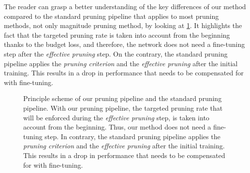 The reader can grasp a better understanding of the key differences of our method
compared to the standard pruning pipeline that applies to most pruning methods,
not only magnitude pruning method, by looking at
\cref{fig:chap1:pruning_pipeline_comparison}. It highlights the fact that the
targeted pruning rate is taken into account from the beginning thanks to the
budget loss, and therefore, the network does not need a fine-tuning step after
the \emph{effective pruning} step. On the contrary, the standard pruning
pipeline applies the \emph{pruning criterion} and the \emph{effective pruning}
after the initial training. This results in a drop in performance that needs to
be compensated for with fine-tuning. \\

\begin{figure}
  \centering
    \caption{ Principle scheme of our pruning pipeline and the standard pruning
    pipeline. With our pruning pipeline, the targeted pruning rate that will be
    enforced during the \emph{effective pruning} step, is taken into account
    from the beginning. Thus, our method does not need a fine-tuning step. In
    contrary, the standard pruning pipeline applies the \emph{pruning criterion}
    and the \emph{effective pruning} after the initial training. This results in
    a drop in performance that needs to be compensated for with fine-tuning.}
  \label{fig:chap1:pruning_pipeline_comparison}
\end{figure}

